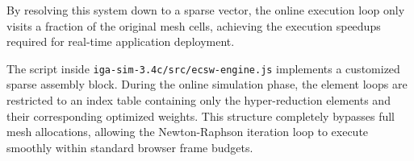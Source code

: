 By resolving this system down to a sparse vector, the online execution loop only visits a fraction of the original mesh cells, achieving the execution speedups required for real-time application deployment.

\begin{devnote}
The script inside \texttt{iga-sim-3.4c/src/ecsw-engine.js} implements a customized sparse assembly block. During the online simulation phase, the element loops are restricted to an index table containing only the hyper-reduction elements and their corresponding optimized weights. This structure completely bypasses full mesh allocations, allowing the Newton-Raphson iteration loop to execute smoothly within standard browser frame budgets.
\end{devnote}